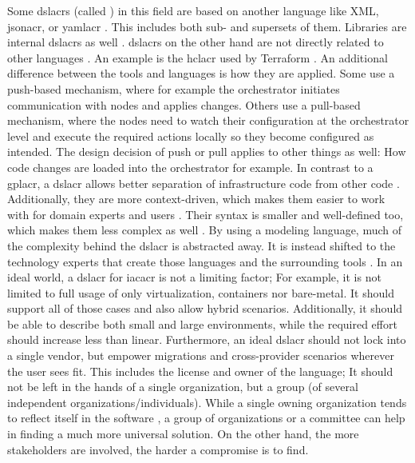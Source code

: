 \newline
Some \gls{dslacr}s (called ) in this field are based on another language like XML, \gls{jsonacr}, or \gls{yamlacr} \cite{iac_oreilly}. This includes both sub- and supersets of them. Libraries are internal \gls{dslacr}s as well \cite{dsl_oreilly}.  \gls{dslacr}s on the other hand are not directly related to other languages \cite{dsl_oreilly}. An example is the \gls{hclacr} used by Terraform \cite{iac_oreilly} \cite{dsl_oreilly}.
\newline
An additional difference between the tools and languages is how they are applied. Some use a push-based mechanism, where for example the orchestrator initiates communication with nodes and applies changes. Others use a pull-based mechanism, where the nodes need to watch their configuration at the orchestrator level and execute the required actions locally so they become configured as intended. The design decision of push or pull applies to other things as well: How code changes are loaded into the orchestrator for example.
\newline
In contrast to a \gls{gplacr}, a \gls{dslacr} allows better separation of infrastructure code from other code \cite{dsl_slides}. Additionally, they are more context-driven, which makes them easier to work with for domain experts and users \cite{dsl_oreilly}. Their syntax is smaller and well-defined too, which makes them less complex as well \cite{dsl_oreilly}.
\newline
By using a modeling language, much of the complexity behind the \gls{dslacr} is abstracted away. It is instead shifted to the technology experts that create those languages and the surrounding tools \cite{dsl_oreilly}.
\newline
In an ideal world, a \gls{dslacr} for \gls{iacacr} is not a limiting factor; For example, it is not limited to full usage of only virtualization, containers nor bare-metal. It should support all of those cases and also allow hybrid scenarios. Additionally, it should be able to describe both small and large environments, while the required effort should increase less than linear. Furthermore, an ideal \gls{dslacr} should not lock into a single vendor, but empower migrations and cross-provider scenarios wherever the user sees fit. This includes the license and owner of the language; It should not be left in the hands of a single organization, but a group (of several independent organizations/individuals). While a single owning organization tends to reflect itself in the software \cite{conways_law}, a group of organizations or a committee can help in finding a much more universal solution. On the other hand, the more stakeholders are involved, the harder a compromise is to find.
